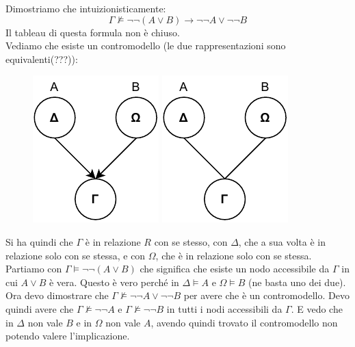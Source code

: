 \documentclass[a4paper,12pt, oneside]{book}
\begin{document}
\begin{esempio}
  Dimostriamo che intuizionisticamente:
  \[\Gamma\nvDash \neg\neg (A\lor B)\to \neg\neg A\lor \neg \neg B\]
  Il tableau di questa formula non è chiuso.\\
  Vediamo che esiste un contromodello (le due rappresentazioni sono
  equivalenti(???)):  
  \begin{figure}[H]
    \centering
    \includegraphics[scale = 0.9]{img/k2.pdf}
    \includegraphics[scale = 0.9]{img/k3.pdf}
  \end{figure}
  Si ha quindi che $\Gamma$ è in relazione $R$ con se stesso, con $\Delta$, che
  a sua volta è in relazione solo con se stessa, e con $\Omega$, che è in
  relazione solo con se stessa. \\
  Partiamo con $\Gamma\vDash \neg\neg (A\lor B)$ che significa che esiste un
  nodo accessibile da $\Gamma$ in cui $A\lor B$ è vera. Questo è vero perché in
  $\Delta\vDash A$ e $\Omega\vDash B$ (ne basta uno dei due).\\
  Ora devo dimostrare che $\Gamma\nvDash\neg\neg A\lor \neg \neg B$ per avere
  che è un contromodello. Devo quindi avere che $\Gamma\nvDash \neg\neg A$ e
  $\Gamma\nvDash \neg\neg B$ in tutti i nodi accessibili da $\Gamma$. E vedo che
  in $\Delta$ non vale $B$ e in $\Omega$ non vale $A$, avendo quindi trovato il
  contromodello non potendo valere l'implicazione.
\end{esempio}
\end{document}
